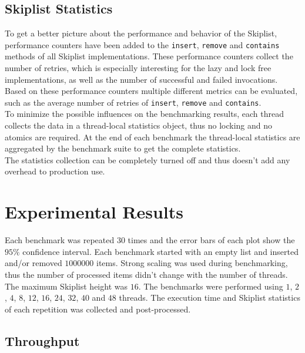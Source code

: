 \subsection{Skiplist Statistics}
To get a better picture about the performance and behavior of the Skiplist, performance counters have been added to the \texttt{insert}, \texttt{remove} and \texttt{contains} methods of all Skiplist implementations. These performance counters collect the number of retries, which is especially interesting for the lazy and lock free implementations, as well as the number of successful and failed invocations. Based on these performance counters multiple different metrics can be evaluated, such as the average number of retries of \texttt{insert}, \texttt{remove} and \texttt{contains}.\\

\noindent To minimize the possible influences on the benchmarking results, each thread collects the data in a thread-local statistics object, thus no locking and no atomics are required. At the end of each benchmark the thread-local statistics are aggregated by the benchmark suite to get the complete statistics.\\

\noindent The statistics collection can be completely turned off and thus doesn't add any overhead to production use.

\section{Experimental Results}

Each benchmark was repeated $30$ times and the error bars of each plot show the $95\%$ confidence interval. Each benchmark started with an empty list and inserted and/or removed $1000000$ items. Strong scaling was used during benchmarking, thus the number of processed items didn't change with the number of threads. The maximum Skiplist height was $16$. The benchmarks were performed using $1$, $2$, $4$, $8$, $12$, $16$, $24$, $32$, $40$ and $48$ threads. The execution time and Skiplist statistics of each repetition was collected and post-processed.

\subsection{Throughput}

